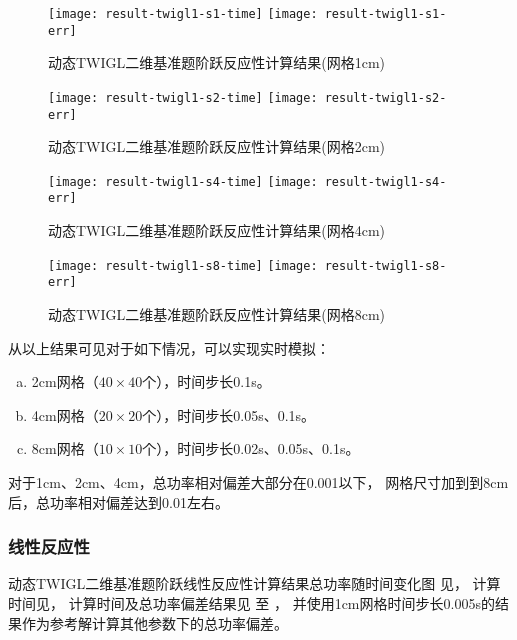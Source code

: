 \begin{figure}[H]
\centering
\texttt{[image: result-twigl1-s1-time]}
\texttt{[image: result-twigl1-s1-err]}
\caption{动态TWIGL二维基准题阶跃反应性计算结果(网格1cm)\label{fig:testresult.twigl.1.1}}
\end{figure}

\begin{figure}[H]
\centering
\texttt{[image: result-twigl1-s2-time]}
\texttt{[image: result-twigl1-s2-err]}
\caption{动态TWIGL二维基准题阶跃反应性计算结果(网格2cm)\label{fig:testresult.twigl.1.2}}
\end{figure}

\begin{figure}[H]
\centering
\texttt{[image: result-twigl1-s4-time]}
\texttt{[image: result-twigl1-s4-err]}
\caption{动态TWIGL二维基准题阶跃反应性计算结果(网格4cm)\label{fig:testresult.twigl.1.4}}
\end{figure}

\begin{figure}[H]
\centering
\texttt{[image: result-twigl1-s8-time]}
\texttt{[image: result-twigl1-s8-err]}
\caption{动态TWIGL二维基准题阶跃反应性计算结果(网格8cm)\label{fig:testresult.twigl.1.8}}
\end{figure}

从以上结果可见对于如下情况，可以实现实时模拟：
\begin{enumerate}[a)]
\item 2cm网格（$40\times40$个），时间步长0.1s。
\item 4cm网格（$20\times20$个），时间步长0.05s、0.1s。
\item 8cm网格（$10\times10$个），时间步长0.02s、0.05s、0.1s。
\end{enumerate}
对于1cm、2cm、4cm，总功率相对偏差大部分在0.001以下，
网格尺寸加到到8cm后，总功率相对偏差达到0.01左右。

\FloatBarrier

\subsubsection{线性反应性}

动态TWIGL二维基准题阶跃线性反应性计算结果总功率随时间变化图
见，
计算时间见，
计算时间及总功率偏差结果见
至
，
并使用1cm网格时间步长0.005s的结果作为参考解计算其他参数下的总功率偏差。


